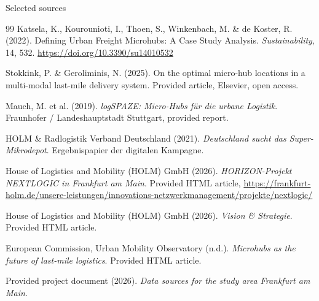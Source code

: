 \documentclass[aspectratio=169,11pt]{beamer}
\begin{document}
\begin{frame}[allowframebreaks]{Selected sources}
\footnotesize
\begin{thebibliography}{99}
Katsela, K., Kourounioti, I., Thoen, S., Winkenbach, M. \& de Koster, R. (2022).
\newblock Defining Urban Freight Microhubs: A Case Study Analysis.
\newblock \emph{Sustainability}, 14, 532. \url{https://doi.org/10.3390/su14010532}

Stokkink, P. \& Geroliminis, N. (2025).
\newblock On the optimal micro-hub locations in a multi-modal last-mile delivery system.
\newblock Provided article, Elsevier, open access.

Mauch, M. et al. (2019).
\newblock \emph{logSPAZE: Micro-Hubs für die urbane Logistik}.
\newblock Fraunhofer / Landeshauptstadt Stuttgart, provided report.

HOLM \& Radlogistik Verband Deutschland (2021).
\newblock \emph{Deutschland sucht das Super-Mikrodepot}.
\newblock Ergebnispapier der digitalen Kampagne.

House of Logistics and Mobility (HOLM) GmbH (2026).
\newblock \emph{HORIZON-Projekt NEXTLOGIC in Frankfurt am Main}.
\newblock Provided HTML article, \url{https://frankfurt-holm.de/unsere-leistungen/innovations-netzwerkmanagement/projekte/nextlogic/}

House of Logistics and Mobility (HOLM) GmbH (2026).
\newblock \emph{Vision \& Strategie}.
\newblock Provided HTML article.

European Commission, Urban Mobility Observatory (n.d.).
\newblock \emph{Microhubs as the future of last-mile logistics}.
\newblock Provided HTML article.

Provided project document (2026).
\newblock \emph{Data sources for the study area Frankfurt am Main}.
\end{thebibliography}
\end{frame}
\end{document}
